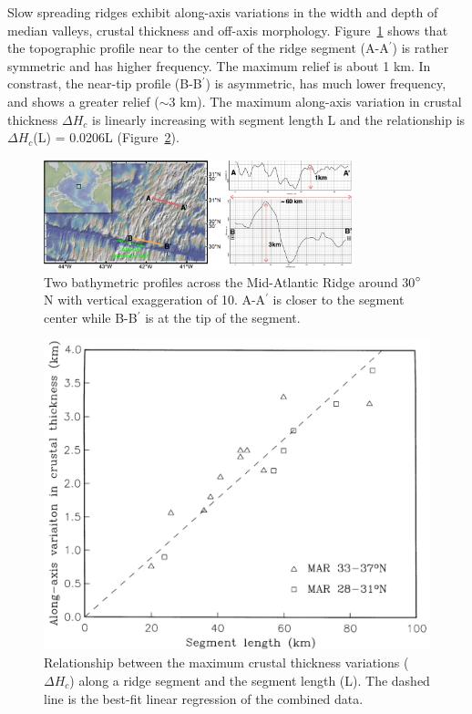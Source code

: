 %
Slow spreading ridges exhibit along-axis variations in the width and depth of median valleys, crustal thickness and off-axis morphology.  Figure~\ref{fig_Intro2_1} shows that the topographic profile near to the center of the ridge segment (A-A$^{\prime}$) is rather symmetric and has higher frequency. The maximum relief is about 1 km. In constrast, the near-tip profile (B-B$^{\prime}$) is asymmetric, has much lower frequency, and shows a greater relief ($\sim$3 km). 
The maximum along-axis variation in crustal thickness $\Delta H_{c}$ is linearly increasing with segment length L \citep{Chen1999} and the relationship is $\Delta H_{c}$(L) = 0.0206L (Figure~\ref{fig_Intro3_1}). 

\begin{figure}[H]
 \centering
  \includegraphics[width=0.8\textwidth]{./Figures/fig_Intro2_1.png}
 \caption{\small{Two bathymetric profiles across the Mid-Atlantic Ridge around 30$\degree$N with vertical exaggeration of 10. A-A$^{\prime}$ is closer to the segment center while B-B$^{\prime}$ is at the tip of the segment.}}
 
 \label{fig_Intro2_1}
\end{figure}

\begin{figure}[H]
 \centering
  \includegraphics[scale=0.3]{./Figures/fig_Intro3_1.png}
 \caption{\small{Relationship between the maximum crustal thickness variations ($\Delta H_{c}$) along a ridge segment and the segment length (L). The dashed line is the best-fit linear regression of the combined data. \citep{Chen1999}}}
 \label{fig_Intro3_1}
\end{figure}


